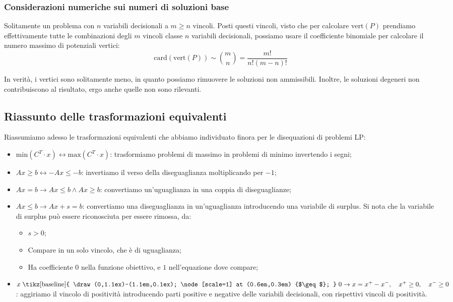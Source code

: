 \documentclass[a4paper,11pt]{article}
\begin{document}
\subsubsection{Considerazioni numeriche sui numeri di soluzioni base}
Solitamente un problema con $n$ variabili decisionali a $m \geq n$ vincoli.
Posti questi vincoli, visto che per calcolare $\mathrm{vert}(P)$ prendiamo effettivamente tutte le combinazioni degli $m$ vincoli classe $n$ variabili decisionali, possiamo usare il coefficiente binomiale per calcolare il numero massimo di potenziali vertici: 
$$ \mathrm{card}(\mathrm{vert}(P)) \sim \binom{m}{n} = \frac{m!}{n!(m-n)!} $$

In verità, i vertici sono solitamente meno, in quanto possiamo rimuovere le soluzioni non ammissibili.
Inoltre, le soluzioni degeneri non contribuiscono al risultato, ergo anche quelle non sono rilevanti.

\subsection{Riassunto delle trasformazioni equivalenti}
Riassumiamo adesso le trasformazioni equivalenti che abbiamo individuato finora per le disequazioni di problemi LP:
\begin{itemize}
	\item $\mathrm{min}(C^T \cdot x) \leftrightarrow \mathrm{max}(C^T \cdot x)$: trasformiamo problemi di massimo in problemi di minimo invertendo i segni;
	\item $Ax \geq b \leftrightarrow -Ax \leq -b$: invertiamo il verso della diseguaglianza moltiplicando per $-1$;
	\item $Ax = b \rightarrow Ax \leq b \wedge Ax \geq b$: convertiamo un'uguaglianza in una coppia di diseguaglianze;
	\item $Ax \leq b \rightarrow Ax + s = b$: convertiamo una diseguaglianza in un'uguaglianza introducendo una variabile di surplus. Si nota che la variabile di surplus può essere riconosciuta per essere rimossa, da:
		\begin{itemize}
			\item $s > 0$;
			\item Compare in un solo vincolo, che è di uguaglianza;
			\item Ha coefficiente $0$ nella funzione obiettivo, e $1$ nell'equazione dove compare;
		\end{itemize}
	\item $ x \mathrel{\text{\tikz[baseline]{
    \draw (0,1.1ex)--(1.1em,0.1ex);
    \node[scale=1] at (0.6em,0.3em) {$\geq$};
  }}} 0 \rightarrow x = x^+ - x^-, \quad x^+ \geq 0, \quad x^- \geq 0$: aggiriamo il vincolo di positività introducendo parti positive e negative delle variabili decisionali, con rispettivi vincoli di positività.
\end{itemize}
\end{document}
